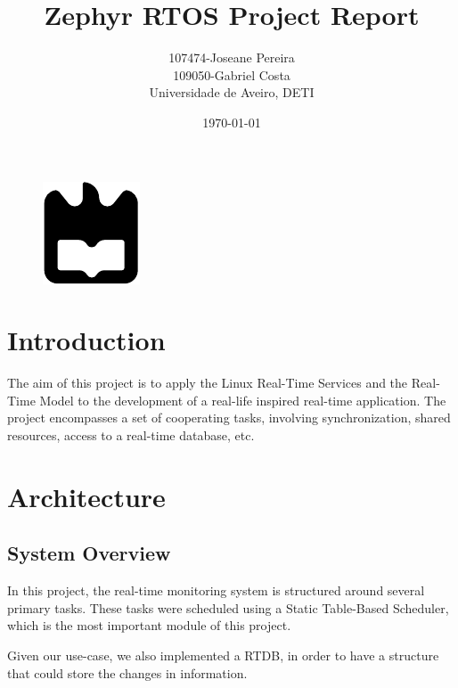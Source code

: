 \documentclass[a4paper,12pt]{article}
\title{Zephyr RTOS Project Report}
\author{
107474-Joseane Pereira \\
109050-Gabriel Costa \\
Universidade de Aveiro, DETI
}
\date{\today}
\begin{document}
\begin{figure}
    \centering
    \includegraphics[width=0.3\linewidth]{ua.pdf}
    \label{fig:enter-label}
\end{figure}
\maketitle
\newpage
\tableofcontents
\newpage

\section{Introduction}
The aim of this project is to apply the Linux Real-Time Services and the Real-Time Model to the development of a real-life inspired real-time application. The project encompasses a set of cooperating tasks, involving synchronization, shared resources, access to a real-time database, etc.

\section{Architecture}
\subsection{System Overview}
In this project, the real-time monitoring system is structured around several primary tasks. These tasks were scheduled using a Static Table-Based Scheduler, which is the most important module of this project. 

Given our use-case, we also implemented a RTDB, in order to have a structure that could store the changes in information.
\end{document}
